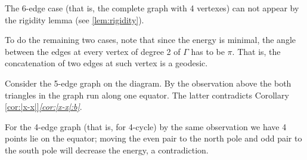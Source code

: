 The 6-edge case (that is, the complete graph with 4 vertexes) can not appear by the rigidity lemma (see \ref{lem:rigidity}).

To do the remaining two cases, note that since the energy is minimal, the angle between the edges at every vertex of degree 2 of $\Gamma$ has to be $\pi$. 
That is, the concatenation of two edges at such vertex is a geodesic.

Consider the 5-edge graph on the diagram.
By the observation above the both triangles in the graph run along one equator.
The latter contradicts Corollary \ref{cor:|x-x|}\textit{\ref{cor:|x-x|:b}}.

For the 4-edge graph (that is, for 4-cycle)
by the same observation we have 4 points lie on the equator; 
moving the even pair to the north pole and odd pair to the south pole will decrease the energy, a contradiction.
\qeds
